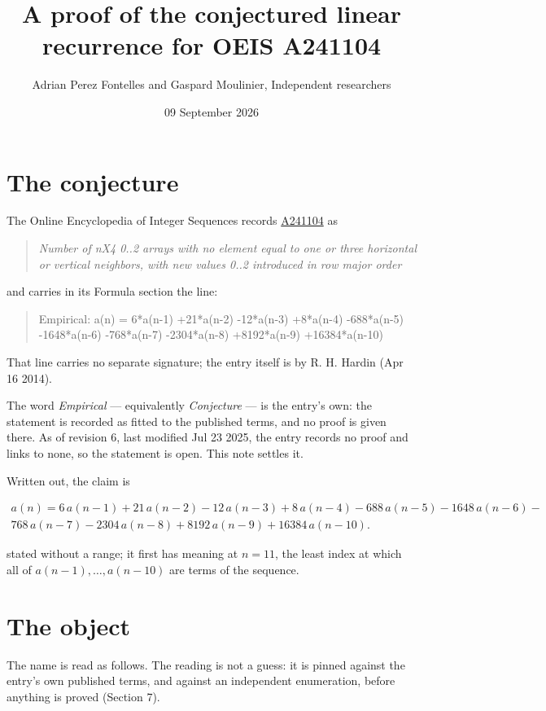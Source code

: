 \documentclass[11pt]{article}
\title{A proof of the conjectured linear recurrence for OEIS A241104}
\author{Adrian Perez Fontelles and Gaspard Moulinier, Independent researchers}
\date{09 September 2026}
\theoremstyle{definition}
\begin{document}
\maketitle
\section{The conjecture}

The Online Encyclopedia of Integer Sequences records \href{https://oeis.org/A241104}{A241104} as

\begin{quote}\itshape Number of nX4 0..2 arrays with no element equal to one or three horizontal or vertical neighbors, with new values 0..2 introduced in row major order\end{quote}

and carries in its Formula section the line:

\begin{quote}\ttfamily Empirical: a(n) = 6*a(n-1) +21*a(n-2) -12*a(n-3) +8*a(n-4) -688*a(n-5) -1648*a(n-6) -768*a(n-7) -2304*a(n-8) +8192*a(n-9) +16384*a(n-10)\end{quote}

That line carries no separate signature; the entry itself is by R. H. Hardin (Apr 16 2014).

The word {\itshape Empirical} --- equivalently {\itshape Conjecture} --- is the entry's own: the statement is recorded as fitted to the published terms, and no proof is given there. As of revision 6, last modified Jul 23 2025, the entry records no proof and links to none, so the statement is open. This note settles it.

Written out, the claim is

\begin{multline*} a(n) = 6\,a(n-1) + 21\,a(n-2) - 12\,a(n-3) + 8\,a(n-4) - 688\,a(n-5) - 1648\,a(n-6) - \\ 768\,a(n-7) - 2304\,a(n-8) + 8192\,a(n-9) + 16384\,a(n-10). \end{multline*}

stated without a range; it first has meaning at $n = 11$, the least index at which all of $a(n-1),\dots,a(n-10)$ are terms of the sequence.

\section{The object}

The name is read as follows. The reading is not a guess: it is pinned against the entry's own published terms, and against an independent enumeration, before anything is proved (Section 7).
\end{document}
